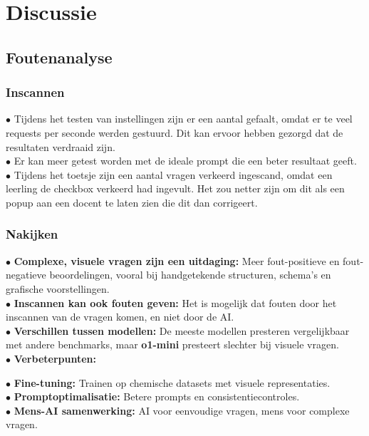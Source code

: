 \documentclass[12pt]{article}
\begin{document}
\pagebreak
\section{Discussie}
\subsection{Foutenanalyse}
\begin{multicols}{2}
\noindent\begin{minipage}{\linewidth}
    
\subsubsection{Inscannen}
$\bullet$ Tijdens het testen van instellingen zijn er een aantal gefaalt, omdat er te veel requests per seconde werden gestuurd. Dit kan ervoor hebben gezorgd dat de resultaten verdraaid zijn.\\
$\bullet$ Er kan meer getest worden met de ideale prompt die een beter resultaat geeft. \\
$\bullet$ Tijdens het toetsje zijn een aantal vragen verkeerd ingescand, omdat een leerling de checkbox verkeerd had ingevult. Het zou netter zijn om dit als een popup aan een docent te laten zien die dit dan corrigeert.\\
\end{minipage}

\noindent\begin{minipage}{\linewidth}
\subsubsection{Nakijken}
$\bullet$ \textbf{Complexe, visuele vragen zijn een uitdaging:} Meer fout-positieve en fout-negatieve beoordelingen, vooral bij handgetekende structuren, schema's en grafische voorstellingen.\\
$\bullet$ \textbf{Inscannen kan ook fouten geven:} Het is mogelijk dat fouten door het inscannen van de vragen komen, en niet door de AI.\\
$\bullet$ \textbf{Verschillen tussen modellen:} De meeste modellen presteren vergelijkbaar met andere benchmarks, maar \textbf{o1-mini} presteert slechter bij visuele vragen.\\
$\bullet$ \textbf{Verbeterpunten:}\\
\hspace{3em}\begin{minipage}{0.9\linewidth}
$\bullet$ \textbf{Fine-tuning:} Trainen op chemische datasets met visuele representaties.\\
$\bullet$ \textbf{Promptoptimalisatie:} Betere prompts en consistentiecontroles.\\
$\bullet$ \textbf{Mens-AI samenwerking:} AI voor eenvoudige vragen, mens voor complexe vragen.
\end{minipage}
\end{minipage}

\end{multicols}
\end{document}
